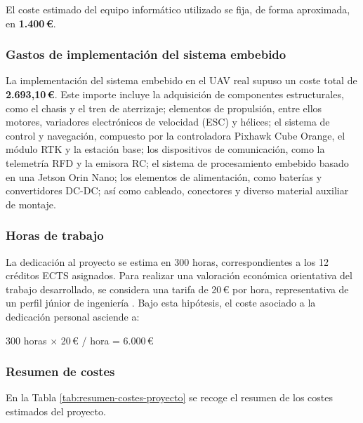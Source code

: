 El coste estimado del equipo informático utilizado se fija, de forma aproximada, en \textbf{1.400\,€}.

\vspace{0.4cm}

\subsubsection{Gastos de implementación del sistema embebido}

La implementación del sistema embebido en el UAV real supuso un coste total de \textbf{2.693,10\,€}. Este importe incluye la adquisición de componentes estructurales, como el chasis y el tren de aterrizaje; elementos de propulsión, entre ellos motores, variadores electrónicos de velocidad (ESC) y hélices; el sistema de control y navegación, compuesto por la controladora Pixhawk Cube Orange, el módulo RTK y la estación base; los dispositivos de comunicación, como la telemetría RFD y la emisora RC; el sistema de procesamiento embebido basado en una Jetson Orin Nano; los elementos de alimentación, como baterías y convertidores DC-DC; así como cableado, conectores y diverso material auxiliar de montaje.

\vspace{0.4cm}

\subsubsection{Horas de trabajo}

La dedicación al proyecto se estima en 300 horas, correspondientes a los 12 créditos ECTS asignados. Para realizar una valoración económica orientativa del trabajo desarrollado, se considera una tarifa de 20\,€ por hora, representativa de un perfil júnior de ingeniería \cite{jobted2025}. Bajo esta hipótesis, el coste asociado a la dedicación personal asciende a:

\begin{center}
300 horas $\times$ 20\,€ / hora = 6.000\,€
\end{center}

\vspace{0.4cm}

\subsubsection{Resumen de costes}

En la Tabla \ref{tab:resumen-costes-proyecto} se recoge el resumen de los costes estimados del proyecto.

